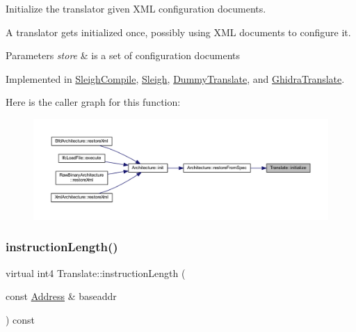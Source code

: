 Initialize the translator given X\+ML configuration documents. 

A translator gets initialized once, possibly using X\+ML documents to configure it. 
\begin{DoxyParams}{Parameters}
{\em store} & is a set of configuration documents \\
\hline
\end{DoxyParams}


Implemented in \mbox{\hyperlink{class_sleigh_compile_afbc2737c7b6421eba8b0cca13039270c}{Sleigh\+Compile}}, \mbox{\hyperlink{class_sleigh_aca7ce17e881917e515aa45ea48810e45}{Sleigh}}, \mbox{\hyperlink{class_dummy_translate_a25f1165b176b80b6b8d1a4230230c97e}{Dummy\+Translate}}, and \mbox{\hyperlink{class_ghidra_translate_a9a2e9180ab58ec05380f62009a7822c6}{Ghidra\+Translate}}.

Here is the caller graph for this function\+:
\nopagebreak
\begin{figure}[H]
\begin{center}
\leavevmode
\includegraphics[width=350pt]{class_translate_af8e71e9a9477e9a91be400ecca565df5_icgraph}
\end{center}
\end{figure}
\mbox{\label{class_translate_aa7139376886fccfdcda529fc74f7b382}} 
\subsubsection{\texorpdfstring{instructionLength()}{instructionLength()}}
{\footnotesize\ttfamily virtual int4 Translate\+::instruction\+Length (\begin{DoxyParamCaption}\item[{const \mbox{\hyperlink{class_address}{Address}} \&}]{baseaddr }\end{DoxyParamCaption}) const\hspace{0.3cm}{\ttfamily [pure virtual]}}



